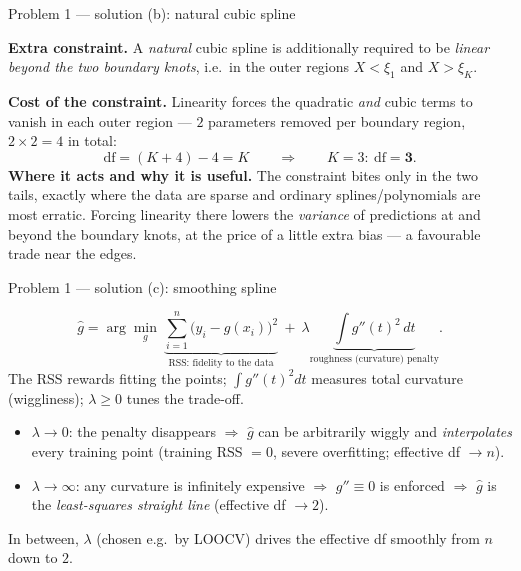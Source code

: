 \documentclass[aspectratio=169,11pt]{beamer}
\begin{document}
\begin{frame}{Problem 1 --- solution (b): natural cubic spline}
  \begin{solutionbox}
    \textbf{Extra constraint.} A \emph{natural} cubic spline is additionally required to be
    \emph{linear beyond the two boundary knots}, i.e.\ in the outer regions $X<\xi_1$ and
    $X>\xi_K$.
    \medskip

    \textbf{Cost of the constraint.} Linearity forces the quadratic \emph{and} cubic terms to
    vanish in each outer region --- $2$ parameters removed per boundary region, $2\times2=4$ in
    total:
    \[
      \mathrm{df}=(K+4)-4=K
      \qquad\Longrightarrow\qquad K=3:\ \mathrm{df}=\mathbf{3}.
    \]
    \textbf{Where it acts and why it is useful.} The constraint bites only in the two tails,
    exactly where the data are sparse and ordinary splines/polynomials are most erratic. Forcing
    linearity there lowers the \emph{variance} of predictions at and beyond the boundary knots, at
    the price of a little extra bias --- a favourable trade near the edges.
  \end{solutionbox}
\end{frame}

\begin{frame}{Problem 1 --- solution (c): smoothing spline}
  \begin{solutionbox}
    \[
      \hat g=\arg\min_g\ \underbrace{\sum_{i=1}^n\bigl(y_i-g(x_i)\bigr)^2}_{\text{RSS: fidelity to the data}}
      \ +\ \lambda\underbrace{\int g''(t)^2\,dt}_{\text{roughness (curvature) penalty}}.
    \]
    The RSS rewards fitting the points; $\int g''(t)^2dt$ measures total curvature (wiggliness);
    $\lambda\ge0$ tunes the trade-off.
    \begin{itemize}
      \item $\lambda\to0$: the penalty disappears $\Rightarrow$ $\hat g$ can be arbitrarily wiggly
        and \emph{interpolates} every training point (training RSS $=0$, severe overfitting;
        effective df $\to n$).
      \item $\lambda\to\infty$: any curvature is infinitely expensive $\Rightarrow$ $g''\equiv0$ is
        enforced $\Rightarrow$ $\hat g$ is the \emph{least-squares straight line} (effective
        df $\to2$).
    \end{itemize}
    In between, $\lambda$ (chosen e.g.\ by LOOCV) drives the effective df smoothly from $n$ down
    to $2$.
  \end{solutionbox}
\end{frame}
\end{document}
